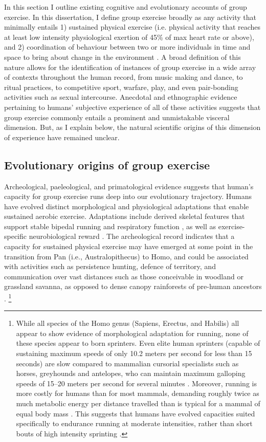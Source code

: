 \begin{CJK}{UTF8}{gbsn}
In this section I outline existing cognitive and evolutionary accounts of group exercise.  In this dissertation, I define group exercise broadly as any activity that minimally entails 1) sustained physical exercise (i.e. physical activity that reaches at least low intensity physiological exertion of 45\% of max heart rate or above), and 2) coordination of behaviour between two or more individuals in time and space to bring about change in the environment \citep[a.k.a., joint action, see][]{Sebanz2006,Vesper2010}.  A broad definition of this nature allows for the identification of instances of group exercise in a wide array of contexts throughout the human record, from music making and dance, to ritual practices, to competitive sport, warfare, play, and even pair-bonding activities such as sexual intercourse.  Anecdotal and ethnographic evidence pertaining to humans' subjective experience of all of these activities suggests that group exercise commonly entails a prominent and unmistakable visceral dimension. But, as I explain below, the natural scientific origins of this dimension of experience have remained unclear.


\subsection{Evolutionary origins of group exercise}
Archeological, paeleological, and primatological evidence suggests that human’s capacity for group exercise runs deep into our evolutionary trajectory.  Humans have evolved distinct morphological and physiological adaptations that enable sustained aerobic exercise.  Adaptations include derived skeletal features that support stable bipedal running and respiratory function \citep[see ][]{Bramble2004}, as well as exercise-specific neurobiological reward \citep{Raichlen2012}.  The archeological record indicates that a capacity for sustained physical exercise may have emerged at some point in the transition from Pan (i.e., Australopithecus) to Homo, and could be associated with activities such as persistence hunting, defence of territory, and communication over vast distances such as those conceivable in woodland or grassland savanna, as opposed to dense canopy rainforests of pre-human ancestors \citep{Sands2012}.
    \footnote{While all species of the Homo genus (Sapiens, Erectus, and Habilis) all appear to show evidence of morphological adaptation for running, none of these species appear to born sprinters.  Even elite human sprinters (capable of sustaining maximum speeds of only 10.2 meters per second for less than 15 seconds) are slow compared to mammalian cursorial specialists such as horses, greyhounds and antelopes, who can maintain maximum galloping speeds of 15–20 meters per second for several minutes \citep{Garland1983}.  Moreover, running is more costly for humans than for most mammals, demanding roughly twice as much metabolic energy per distance travelled than is typical for a mammal of equal body mass \citep{Taylor1982}.  This suggests that humans have evolved capacities suited specifically to endurance running at moderate intensities, rather than short bouts of high intensity sprinting \citep{Bramble2004}.}


\end{CJK}
